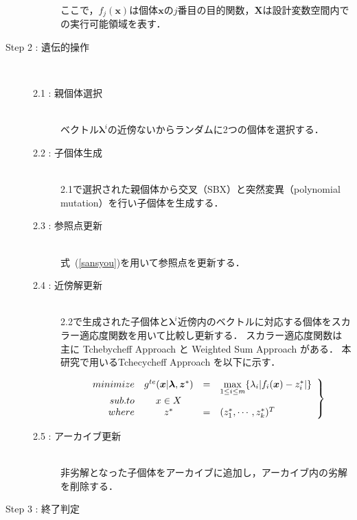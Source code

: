 \documentclass[11pt,a4j,notitlepage]{jreport}
\newcommand{\Eqref}[1]{式~(\ref{#1})}
\newcommand{\mymax}{\mathop{\rm max}\limits}
\begin{document}
\begin{description}
\begin{description}
	ここで，$f_j (\bm x)$は個体$\bm x$の$j$番目の目的関数，$\bm X$は設計変数空間内での実行可能領域を表す．

	\vspace{-0.1in}

	\end{description}
\item[Step 2 : 遺伝的操作]\mbox{}\\
\vspace{-0.5in}
	\begin{description}
	\item[2.1 : 親個体選択]\mbox{}\\
	ベクトル$\bm \lambda^i$の近傍ないからランダムに2つの個体を選択する．

	\item[2.2 : 子個体生成]\mbox{}\\
	2.1で選択された親個体から交叉（SBX）と突然変異（polynomial mutation）を行い子個体を生成する．

	\item[2.3 : 参照点更新]\mbox{}\\
	\Eqref{sansyou}を用いて参照点を更新する．

	\item[2.4 : 近傍解更新]\mbox{}\\
	2.2で生成された子個体と$\bm \lambda^i$近傍内のベクトルに対応する個体をスカラー適応度関数を用いて比較し更新する．
	スカラー適応度関数は主に Tchebycheff Approach と Weighted Sum Approach がある．
	本研究で用いるTchecycheff Approach を以下に示す．

	\begin{eqnarray}
	\left.
	\begin{array}{rccl}
	minimize & g^{te} (\bm x|\bm \lambda , \bm z^*)& =& \mymax_{1 \leq i \leq m} \{ \lambda_i|f_i (\bm x) - z^*_i| \}\\
	sub.to & x \in X &  &  \\
	where & z^* & = & (z_1^*, \cdots, z^*_k)^T
	\end{array}
	\right\}
	\label{sansyou}
	\end{eqnarray}



	\item[2.5 : アーカイブ更新]\mbox{}\\
	非劣解となった子個体をアーカイブに追加し，アーカイブ内の劣解を削除する．
	\vspace{-0.1in}

	\end{description}
\item[Step 3 : 終了判定]\mbox{}\\

\end{description}
\end{document}
